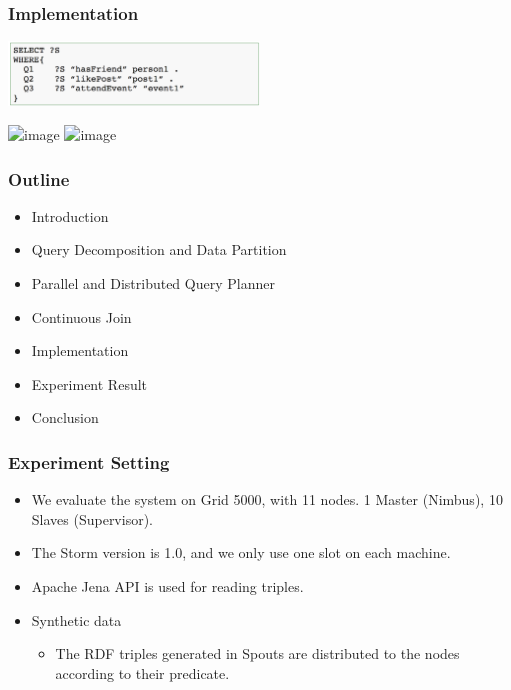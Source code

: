 \begin{frame}
\frametitle{Implementation}
\vspace{-0.1in}
\begin{center}
\includegraphics[width=0.5\textwidth]{figs/examplequery.png}
\end{center}
\vspace{-0.2in}
    \begin{center}
    	\includegraphics<1>[width=0.8\textwidth]{figs/implementation1.png}
    	\includegraphics<2>[width=0.8\textwidth]{figs/implementation2.png}
    \end{center}
\end{frame}


\begin{frame}
\frametitle{Outline}
	\begin{itemize}
		\item Introduction
		\item Query Decomposition and Data Partition
		\item Parallel and Distributed Query Planner
		\item Continuous Join
		\item Implementation
		\item Experiment Result
		\item \textcolor{blue!20}{Conclusion}
	\end{itemize}
\end{frame}

\begin{frame}
\frametitle{Experiment Setting}
\begin{itemize}
\item We evaluate the system on Grid 5000, with 11 nodes. 1 Master (Nimbus), 10 Slaves (Supervisor). 

\item The Storm version is 1.0, and we only use one slot on each machine.

\item Apache Jena API is used for reading triples.
\end{itemize}

\begin{itemize}
\item Synthetic data
\begin{itemize}
\item The RDF triples generated in Spouts are distributed to the nodes according to their predicate. 
\end{itemize}
\end{itemize}

\end{frame}


